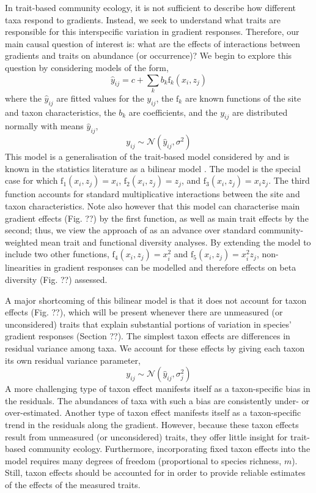 \documentclass[12pt]{ecology}
\begin{document}
In trait-based community ecology, it is not sufficient to describe how different taxa respond to gradients.  Instead, we seek to understand what traits are responsible for this interspecific variation in gradient responses.  Therefore, our main causal question of interest is:  what are the effects of interactions between gradients and traits on abundance (or occurrence)?  We begin to explore this question by considering models of the form,
\begin{equation}
\hat{y}_{ij} = c + 
	\sum_k b_k \mathrm{f}_k (x_i, z_j)
\end{equation}
where the $\hat{y}_{ij}$ are fitted values for the $y_{ij}$, the $\mathrm{f}_k$ are known functions of the site and taxon characteristics, the $b_k$ are coefficients, and the $y_{ij}$ are distributed normally with means $\hat{y}_{ij}$,
\begin{equation}
y_{ij} \sim \mathcal{N}(\hat{y}_{ij},\sigma^2)
\end{equation}
This model is a generalisation of the trait-based model considered by \citet{CormontEtAl2011} and is known in the statistics literature as a bilinear model \citep{Gabriel1998}.  The \citet{CormontEtAl2011} model is the special case for which $\mathrm{f}_1(x_i, z_j) = x_i$, $\mathrm{f}_2(x_i, z_j) = z_j$, and $\mathrm{f}_3(x_i, z_j) = x_i z_j$.  The third function accounts for standard multiplicative interactions between the site and taxon characteristics.  Note also however that this model can characterise main gradient effects (Fig. ??) by the first function, as well as main trait effects by the second; thus, we view the approach of \citet{CormontEtAl2011} as an advance over standard community-weighted mean trait and functional diversity analyses.  By extending the model to include two other functions, $\mathrm{f}_4(x_i, z_j) = x_i^2$ and $\mathrm{f}_5(x_i, z_j) = x_i^2 z_j$, non-linearities in gradient responses can be modelled and therefore effects on beta diversity (Fig. ??) assessed.

A major shortcoming of this bilinear model is that it does not account for taxon effects (Fig. ??), which will be present whenever there are unmeasured (or unconsidered) traits that explain substantial portions of variation in species' gradient responses (Section ??).  The simplest taxon effects are differences in residual variance among taxa.  We account for these effects by giving each taxon its own residual variance parameter,
\begin{equation}
y_{ij} \sim \mathcal{N}(\hat{y}_{ij},\sigma_j^2)
\end{equation}
A more challenging type of taxon effect manifests itself as a taxon-specific bias in the residuals.  The abundances of taxa with such a bias are consistently under- or over-estimated.  Another type of taxon effect manifests itself as a taxon-specific trend in the residuals along the gradient.  However, because these taxon effects result from unmeasured (or unconsidered) traits, they offer little insight for trait-based community ecology.  Furthermore, incorporating fixed taxon effects into the model requires many degrees of freedom (proportional to species richness, $m$).  Still, taxon effects should be accounted for in order to provide reliable estimates of the effects of the measured traits.  
\end{document}

